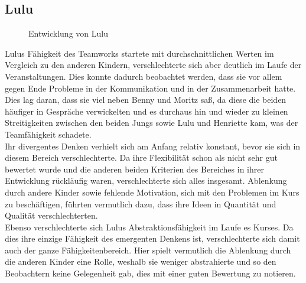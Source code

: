 \subsection*{Lulu}
\begin{figure}[H]
	\centering
	\caption{Entwicklung von Lulu}
	\label{img:luluDevelopment}	
\end{figure}
Lulus Fähigkeit des Teamworks startete mit durchschnittlichen Werten im Vergleich zu den anderen Kindern, verschlechterte sich aber deutlich im Laufe der Veranstaltungen. Dies konnte dadurch beobachtet werden, dass sie vor allem gegen Ende Probleme in der Kommunikation und in der Zusammenarbeit hatte. Dies lag daran, dass sie viel neben Benny und Moritz saß, da diese die beiden häufiger in Gespräche verwickelten und es durchaus hin und wieder zu kleinen Streitigkeiten zwischen den beiden Jungs sowie Lulu und Henriette kam, was der Teamfähigkeit schadete.\\
Ihr divergentes Denken verhielt sich am Anfang relativ konstant, bevor sie sich in diesem Bereich verschlechterte. Da ihre Flexibilität schon als nicht sehr gut bewertet wurde und die anderen beiden Kriterien des Bereiches in ihrer Entwicklung rückläufig waren, verschlechterte sich alles insgesamt. Ablenkung durch andere Kinder sowie fehlende Motivation, sich mit den Problemen im Kurs zu beschäftigen, führten vermutlich dazu, dass ihre Ideen in Quantität und Qualität verschlechterten.\\
Ebenso verschlechterte sich Lulus Abstraktionsfähigkeit im Laufe es Kurses. Da dies ihre einzige Fähigkeit des emergenten Denkens ist, verschlechterte sich damit auch der ganze Fähigkeitenbereich. Hier spielt vermutlich die Ablenkung durch die anderen Kinder eine Rolle, weshalb sie weniger abstrahierte und so den Beobachtern keine Gelegenheit gab, dies mit einer guten Bewertung zu notieren. \\
